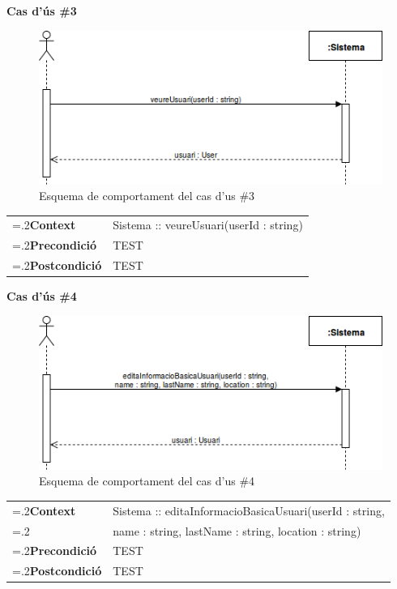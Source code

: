\clearpage
\noindent\textbf{\large Cas d'ús \#3}\\
\begin{figure}[H]
\centering
\includegraphics[scale=0.6]{Figures/casdus_03.png}
\caption{Esquema de comportament del cas d'us \#3}
\end{figure}
\begin{table}[h]
\noindent
\begin{tabularx}{\linewidth}{
>{\hsize=.2\hsize}X%
>{\hsize=0.8\hsize}X%
}
\textbf{Context} 		& Sistema :: veureUsuari(userId : string) \\
\textbf{Precondició} 	& TEST \\
\textbf{Postcondició}	& TEST \\
\end{tabularx}
\label{}
\end{table}

\noindent\textbf{\large Cas d'ús \#4}\\
\begin{figure}[H]
\centering
\includegraphics[scale=0.6]{Figures/casdus_04.png}
\caption{Esquema de comportament del cas d'us \#4}
\end{figure}
\begin{table}[h]
\noindent
\begin{tabularx}{\linewidth}{
>{\hsize=.2\hsize}X%
>{\hsize=0.8\hsize}X%
}
\textbf{Context} 		& Sistema :: editaInformacioBasicaUsuari(userId : string, \\
						& name : string, lastName : string, location : string) \\
\textbf{Precondició} 	& TEST \\
\textbf{Postcondició}	& TEST \\
\end{tabularx}
\label{}
\end{table}

